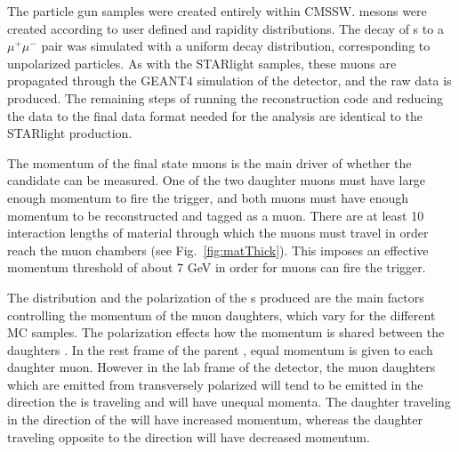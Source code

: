     The particle gun samples were created entirely within CMSSW.
    \JPsi{} mesons were created according to user defined \pt{} and rapidity
      distributions. 
    The decay of \JPsi{}s to a $\mu^{+}$$\mu^{-}$ pair was simulated with
      a uniform decay distribution, corresponding to unpolarized \JPsi{} 
      particles.
    As with the STARlight samples, these muons are propagated through the GEANT4
      simulation \cite{geant} of the detector, and the raw data is produced.
    The remaining steps of running the reconstruction code and reducing the 
      data to the final data format needed for the analysis are identical to 
      the STARlight production.

    The momentum of the final state muons is the main driver of whether the 
      candidate can be measured.
    One of the two daughter muons must have large enough momentum to fire the 
      trigger, and both muons must have enough momentum to be 
      reconstructed and tagged as a muon. 
    There are at least 10 interaction lengths of material through which the 
      muons must travel in order reach the muon chambers 
      (see Fig.~\ref{fig:matThick}).
    This imposes an effective momentum threshold of about 7 GeV in order for 
      muons can fire the trigger. 

    The \pt{} distribution and the polarization of the \JPsi{}s produced are 
      the main factors controlling the momentum of the muon daughters, which
      vary for the different MC samples. 
    The polarization effects how the momentum is shared between the daughters
      \cite{oniaPol}.
    In the rest frame of the parent \JPsi{}, equal momentum is given to each 
      daughter muon. 
    However in the lab frame of the detector, the muon daughters which are 
      emitted from transversely polarized \JPsi{} will tend to be emitted in
      the direction the \JPsi{} is traveling and will have unequal momenta.
    The daughter traveling in the direction of the \JPsi{} will have increased
      momentum, whereas the daughter traveling opposite to the \JPsi{} 
      direction will have decreased momentum. 

